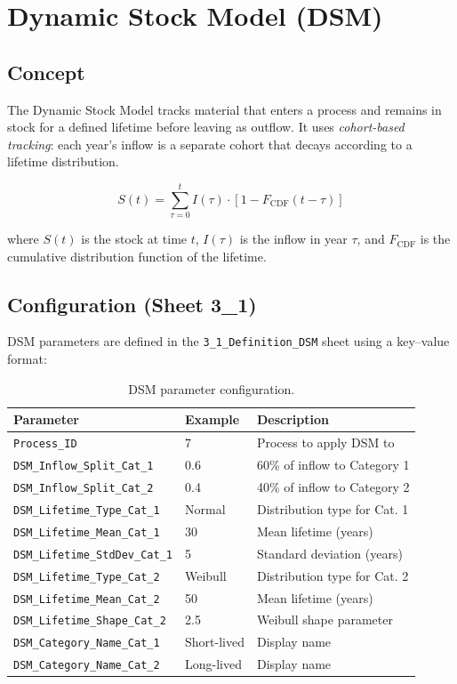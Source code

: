 \chapter{Dynamic Stock Model (DSM)}
\label{ch:dsm}

\section{Concept}

The Dynamic Stock Model tracks material that enters a process and remains in stock for a defined lifetime before leaving as outflow. It uses \emph{cohort-based tracking}: each year's inflow is a separate cohort that decays according to a lifetime distribution.

\begin{equation}
  S(t) = \sum_{\tau=0}^{t} I(\tau) \cdot \left[1 - F_{\text{CDF}}(t - \tau)\right]
\end{equation}

where $S(t)$ is the stock at time $t$, $I(\tau)$ is the inflow in year $\tau$, and $F_{\text{CDF}}$ is the cumulative distribution function of the lifetime.

\section{Configuration (Sheet 3\_1)}

DSM parameters are defined in the \texttt{3\_1\_Definition\_DSM} sheet using a key--value format:

\begin{table}[h]
\centering
\begin{tabular}{llp{5.5cm}}
\toprule
\textbf{Parameter} & \textbf{Example} & \textbf{Description} \\
\midrule
\texttt{Process\_ID} & 7 & Process to apply DSM to \\
\texttt{DSM\_Inflow\_Split\_Cat\_1} & 0.6 & 60\% of inflow to Category 1 \\
\texttt{DSM\_Inflow\_Split\_Cat\_2} & 0.4 & 40\% of inflow to Category 2 \\
\texttt{DSM\_Lifetime\_Type\_Cat\_1} & Normal & Distribution type for Cat. 1 \\
\texttt{DSM\_Lifetime\_Mean\_Cat\_1} & 30 & Mean lifetime (years) \\
\texttt{DSM\_Lifetime\_StdDev\_Cat\_1} & 5 & Standard deviation (years) \\
\texttt{DSM\_Lifetime\_Type\_Cat\_2} & Weibull & Distribution type for Cat. 2 \\
\texttt{DSM\_Lifetime\_Mean\_Cat\_2} & 50 & Mean lifetime (years) \\
\texttt{DSM\_Lifetime\_Shape\_Cat\_2} & 2.5 & Weibull shape parameter \\
\texttt{DSM\_Category\_Name\_Cat\_1} & Short-lived & Display name \\
\texttt{DSM\_Category\_Name\_Cat\_2} & Long-lived & Display name \\
\bottomrule
\end{tabular}
\caption{DSM parameter configuration.}
\end{table}

